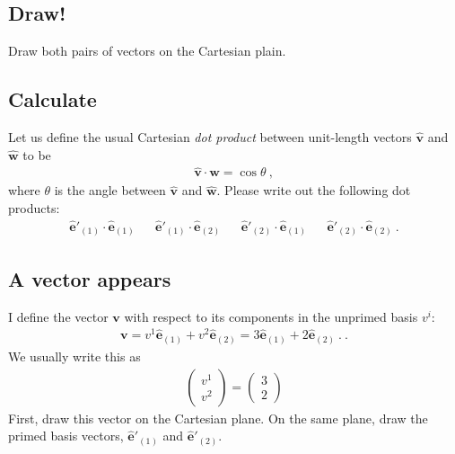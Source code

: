 \documentclass[12pt]{article}
\numberwithin{equation}{section}    %
\renewcommand{\vec}[1]{\mathbf{#1}} %
\begin{document}
\subsection{Draw!}

Draw both pairs of vectors on the Cartesian plain. 

\subsection{Calculate}


Let us define the usual Cartesian \emph{dot product} between unit-length vectors $\hat{\vec{v}}$ and $\hat{\vec{w}}$ to be 
\begin{align}
	\hat{\vec{v}}\cdot \hat{\vec{w}} = \cos\theta \ ,
\end{align}
where $\theta$ is the angle between $\hat{\vec{v}}$ and $\hat{\vec{w}}$. Please write out the following dot products:
\begin{align}
	\hat{\vec{e}}'_{(1)}\cdot \hat{\vec{e}}_{(1)}
	&&
	\hat{\vec{e}}'_{(1)}\cdot \hat{\vec{e}}_{(2)}
	&&
	\hat{\vec{e}}'_{(2)}\cdot \hat{\vec{e}}_{(1)}
	&&
	\hat{\vec{e}}'_{(2)}\cdot \hat{\vec{e}}_{(2)} \ .
	\label{eq:basisdots}
\end{align}

\subsection{A vector appears}\label{sec:avector}

I define the vector $\vec{v}$ with respect to its components in the unprimed basis $v^i$:
\begin{align}
	\vec{v}
	=
	v^1 \hat{\vec{e}}_{(1)} + v^2\hat{\vec{e}}_{(2)}
	=
	3 \hat{\vec{e}}_{(1)} + 2\hat{\vec{e}}_{(2)} \ .
 \ .
\end{align}
We usually write this as
\begin{align}
	\begin{pmatrix}
		v^1\\ v^2
	\end{pmatrix}
	=
	\begin{pmatrix}
		3\\
		2
	\end{pmatrix}
\end{align}
First, draw this vector on the Cartesian plane. On the same plane, draw the primed basis vectors, $\hat{\vec{e}}'_{(1)}$ and $\hat{\vec{e}}'_{(2)}$. 
\end{document}
